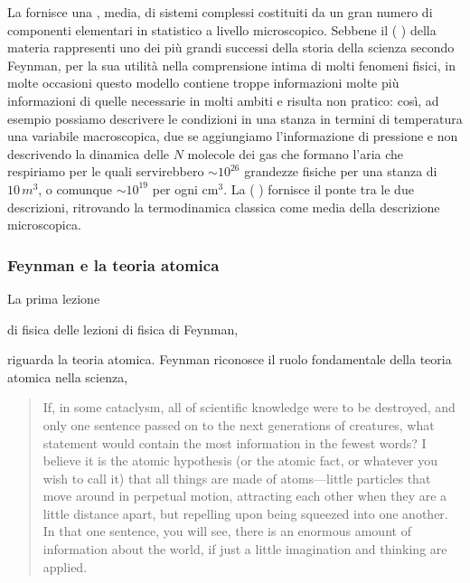 \documentclass[letterpaper,10pt,italian]{jupyterBook}
\begin{document}
\sphinxAtStartPar
La  fornisce una , media, di sistemi complessi costituiti da un gran numero di componenti elementari in  statistico a livello microscopico. Sebbene il  ( ) della materia rappresenti uno dei più grandi successi della storia della scienza secondo Feynman, per la sua utilità nella comprensione intima di molti fenomeni fisici, in molte occasioni questo modello contiene troppe informazioni \sphinxhyphen{} molte più informazioni di quelle necessarie in molti ambiti \sphinxhyphen{} e risulta non pratico: così, ad esempio possiamo descrivere le condizioni in una stanza in termini di temperatura \sphinxhyphen{} una \sphinxstylestrong{(!)} variabile macroscopica, due se aggiungiamo l’informazione di pressione \sphinxhyphen{} e non descrivendo la dinamica delle \(N\) molecole dei gas che formano l’aria che respiriamo \sphinxhyphen{} per le quali servirebbero \(\sim 10^{26}\) grandezze fisiche per una stanza di \(10 \, m^3\), o comunque \(\sim 10^{19}\) per ogni \(\text{cm}^3\). La  ( ) fornisce il ponte tra le due descrizioni, ritrovando la termodinamica classica come media della descrizione microscopica.
\subsubsection*{Feynman e la teoria atomica}

\sphinxAtStartPar
La prima lezione%
\begin{footnote}[1]\sphinxAtStartFootnote
{}
%
\end{footnote} di fisica delle lezioni di fisica di Feynman,  %
\begin{footnote}[2]\sphinxAtStartFootnote
{}
%
\end{footnote} riguarda la teoria atomica. Feynman riconosce il ruolo fondamentale della teoria atomica nella scienza,
\begin{quote}

\sphinxAtStartPar
If, in some cataclysm, all of scientific knowledge were to be destroyed, and only one sentence passed on to the next generations of creatures, what statement would contain the most information in the fewest words? I believe it is the atomic hypothesis (or the atomic fact, or whatever you wish to call it) that all things are made of atoms—little particles that move around in perpetual motion, attracting each other when they are a little distance apart, but repelling upon being squeezed into one another. In that one sentence, you will see, there is an enormous amount of information about the world, if just a little imagination and thinking are applied.
\end{quote}
\end{document}
